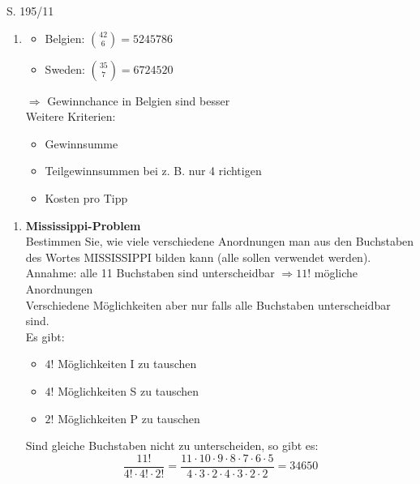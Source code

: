 \begin{Exercise}{S. 195/11}{}
\begin{enumerate}[leftmargin=*]
    \item [11.]{
        \begin{itemize}
            \item Belgien: \quad $\displaystyle \binom{42}{6} = \SI{5245786}{}$
            \item Sweden: \quad $\displaystyle \binom{35}{7} = \SI{6724520}{}$
        \end{itemize}
        $\Rightarrow$ Gewinnchance in Belgien sind besser\\[1.0ex]
        Weitere Kriterien:
        \begin{itemize}
            \item Gewinnsumme
            \item Teilgewinnsummen bei z. B. nur 4 richtigen
            \item Kosten pro Tipp
        \end{itemize}
    }
\end{enumerate}
\end{Exercise}

\pagebreak

\begin{note}
\begin{enumerate}[leftmargin=*]
    \item [4)] {
        \textcolor{myb}{\textbf{Mississippi-Problem}}\\[1.0ex]
        Bestimmen Sie, wie viele verschiedene Anordnungen man aus den Buchstaben des Wortes MISSISSIPPI bilden kann (alle sollen verwendet werden).\\[1.0ex]
        Annahme: alle 11 Buchstaben sind unterscheidbar $\Rightarrow 11!$ mögliche Anordnungen\\[1.0ex]
        Verschiedene Möglichkeiten aber nur falls alle Buchstaben unterscheidbar sind.\\
        Es gibt:
        \begin{itemize}[leftmargin=*]
            \item $4!$ Möglichkeiten I zu tauschen
            \item $4!$ Möglichkeiten S zu tauschen
            \item $2!$ Möglichkeiten P zu tauschen
        \end{itemize}
        Sind gleiche Buchstaben nicht zu unterscheiden, so gibt es:
        \begin{equation*}
            \dfrac{{11!}}{4! \cdot 4! \cdot 2!} = \dfrac{11 \cdot 10 \cdot 9 \cdot 8 \cdot 7 \cdot 6 \cdot 5}{4 \cdot 3 \cdot 2 \cdot 4 \cdot 3 \cdot 2 \cdot 2} = 34650
        \end{equation*}
        }
\end{enumerate}
\end{note}

